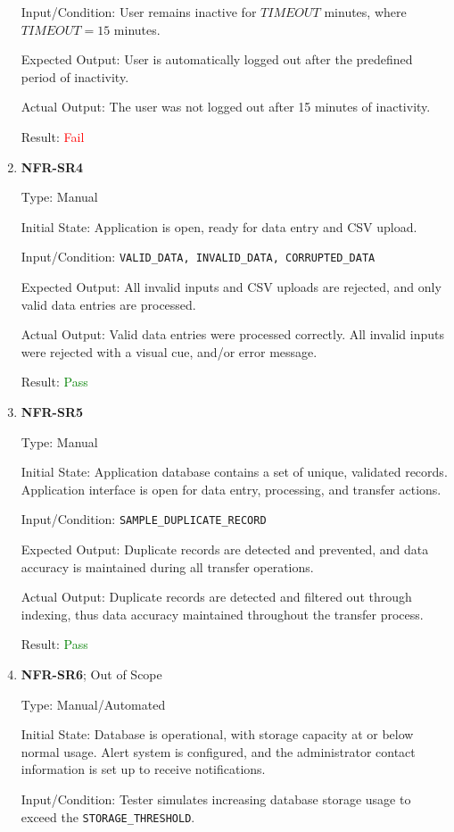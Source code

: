 \documentclass[12pt, titlepage]{article}
\begin{document}
\begin{enumerate}
Input/Condition: User remains inactive for $TIMEOUT$ minutes, where $TIMEOUT =
15$ minutes.

Expected Output: User is automatically logged out after the predefined period of
inactivity.

Actual Output: The user was not logged out after 15 minutes of inactivity.

Result: \textcolor{red}{Fail}
\item{\textbf{NFR-SR4}} \label{NFR:SR4}

Type: Manual

Initial State: Application is open, ready for data entry and CSV upload.

Input/Condition: \texttt{VALID\_DATA, INVALID\_DATA, CORRUPTED\_DATA}

Expected Output: All invalid inputs and CSV uploads are rejected, and only valid
data entries are processed.

Actual Output: Valid data entries were processed correctly. All invalid inputs
were rejected with a visual cue, and/or error message.

Result: \textcolor{green}{Pass}

  \item{\textbf{NFR-SR5}} \label{NFR:SR5}

Type: Manual

Initial State: Application database contains a set of unique, validated records.
Application interface is open for data entry, processing, and transfer actions.

Input/Condition: \texttt{SAMPLE\_DUPLICATE\_RECORD}

Expected Output: Duplicate records are detected and prevented, and data accuracy
is maintained during all transfer operations.

Actual Output: Duplicate records are detected and filtered out through indexing,
thus data accuracy maintained throughout the transfer process.

Result: \textcolor{green}{Pass}

\item{\textbf{NFR-SR6}}; Out of Scope \label{NFR:SR6}

Type: Manual/Automated

Initial State: Database is operational, with storage capacity at or below normal
usage. Alert system is configured, and the administrator contact information is
set up to receive notifications. 

Input/Condition: Tester simulates increasing database storage usage to exceed
the \texttt{STORAGE\_THRESHOLD}.


\end{enumerate}
\end{document}
